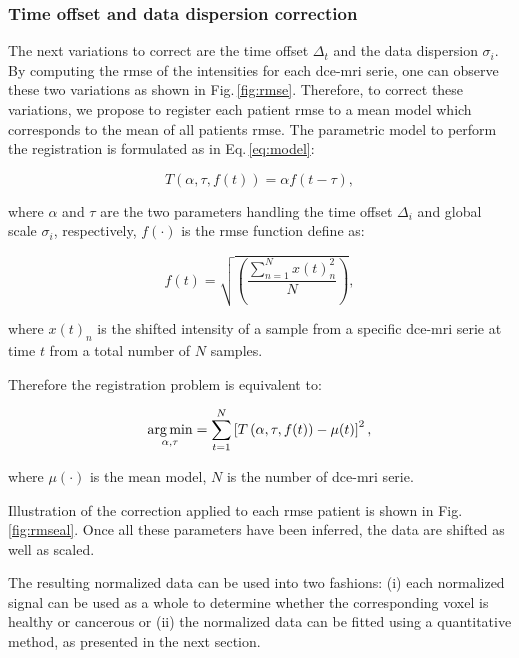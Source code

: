 \subsubsection{Time offset and data dispersion correction}

The next variations to correct are the time offset $\Delta_t$ and the data dispersion $\sigma_i$.
By computing the \ac{rmse} of the intensities for each \ac{dce}-\ac{mri} serie, one can observe these two variations as shown in Fig.\,\ref{fig:rmse}.
Therefore, to correct these variations, we propose to register each patient \ac{rmse} to a mean model which corresponds to the mean of all patients \ac{rmse}.
The parametric model to perform the registration is formulated as in Eq.\,\eqref{eq:model}:

\begin{equation}
  T(\alpha, \tau, f(t)) = \alpha f(t - \tau) ,
  \label{eq:model}
\end{equation}

\noindent where $\alpha$ and $\tau$ are the two parameters handling the time offset $\Delta_i$ and global scale $\sigma_i$, respectively, $f(\cdot)$ is the \ac{rmse} function define as:

\begin{equation}
  f(t) = \sqrt{ \left( \frac{\sum_{n=1}^{N} x(t)_{n}^2}{N}  \right) },
  \label{eq:rmsd}
\end{equation}

\noindent where $x(t)_n$ is the shifted intensity of a sample from a specific \ac{dce}-\ac{mri} serie at time $t$ from a total number of $N$ samples.

Therefore the registration problem is equivalent to:

\begin{equation}
  \operatorname*{arg\,min}_{\alpha, \tau} = \sum_{t=1}^{N} \left[ T\left(\alpha, \tau, f(t)\right) - \mu(t) \right]^{2} ,
  \label{eq:cost}
\end{equation}

\noindent where $\mu(\cdot)$ is the mean model, $N$ is the number of \ac{dce}-\ac{mri} serie.

Illustration of the correction applied to each \ac{rmse} patient is shown in Fig.\,\ref{fig:rmseal}.
Once all these parameters have been inferred, the data are shifted as well as scaled.

The resulting normalized data can be used into two fashions: (i) each normalized signal can be used as a whole to determine whether the corresponding voxel is healthy or cancerous or (ii) the normalized data can be fitted using a quantitative method, as presented in the next section.

